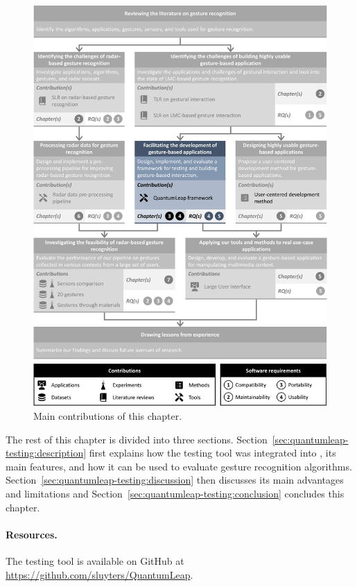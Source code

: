 \begin{figure}
  \centering
  \includegraphics[width=\linewidth]{Figures/QuantumLeap/graphical-summary-quantumleap.pdf}
  \vspace{-18pt}
  \caption{Main contributions of this chapter.}
  \label{fig:quantumleap-testing:graphical-summary}
\end{figure}

The rest of this chapter is divided into three sections.
Section~\ref{sec:quantumleap-testing:description} first explains how the testing tool was integrated into \ql, its main features, and how it can be used to evaluate gesture recognition algorithms.
Section~\ref{sec:quantumleap-testing:discussion} then discusses its main advantages and limitations and Section~\ref{sec:quantumleap-testing:conclusion} concludes this chapter.

\paragraph{Resources.} The \ql testing tool is available on GitHub at \url{https://github.com/sluyters/QuantumLeap}.


